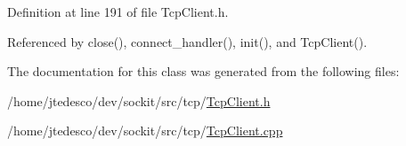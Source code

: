 Definition at line 191 of file TcpClient.h.



Referenced by close(), connect\_\-handler(), init(), and TcpClient().



The documentation for this class was generated from the following files:\begin{DoxyCompactItemize}
\item 
/home/jtedesco/dev/sockit/src/tcp/\hyperlink{TcpClient_8h}{TcpClient.h}\item 
/home/jtedesco/dev/sockit/src/tcp/\hyperlink{TcpClient_8cpp}{TcpClient.cpp}\end{DoxyCompactItemize}
